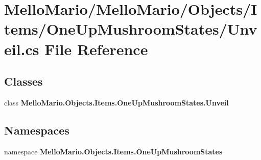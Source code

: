 \section{Mello\+Mario/\+Mello\+Mario/\+Objects/\+Items/\+One\+Up\+Mushroom\+States/\+Unveil.cs File Reference}
\label{OneUpMushroomStates_2Unveil_8cs}
\subsection*{Classes}
\begin{DoxyCompactItemize}
\item 
class \textbf{ Mello\+Mario.\+Objects.\+Items.\+One\+Up\+Mushroom\+States.\+Unveil}
\end{DoxyCompactItemize}
\subsection*{Namespaces}
\begin{DoxyCompactItemize}
\item 
namespace \textbf{ Mello\+Mario.\+Objects.\+Items.\+One\+Up\+Mushroom\+States}
\end{DoxyCompactItemize}
